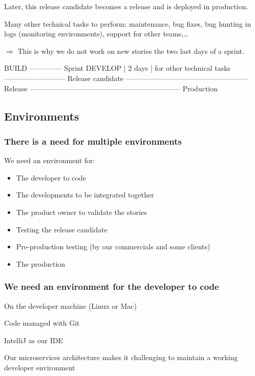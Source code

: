 \documentclass[a4paper, 11pt]{article}
\begin{document}
    Later, this release candidate becomes a release and is deployed in production.

    Many other technical tasks to perform: maintenance, bug fixes, bug hunting in logs (monitoring environments),
    support for other teams,\ldots

    $\Rightarrow$ This is why we do not work on new stories the two last days of a sprint.

    BUILD   -------------- Sprint
    DEVELOP             |   2 days   | for other technical tasks
            -------------------------- Release candidate
            --------------------------------------------------- Release
            --------------------------------------------------------------- Production

    \subsection{Environments}

    \subsubsection{There is a need for multiple environments}

    We need an environment for:

    \begin{itemize}
        \item The developer to code
        \item The developments to be integrated together
        \item The product owner to validate the stories
        \item Testing the release candidate
        \item Pre-production testing (by our commercials and some clients)
        \item The production
    \end{itemize}


    \subsubsection{We need an environment for the developer to code}

    On the developer machine (Linux or Mac)

    Code managed with Git

    IntelliJ as our IDE

    Our microservices architecture makes it challenging to maintain a working
    developer environment
\end{document}
